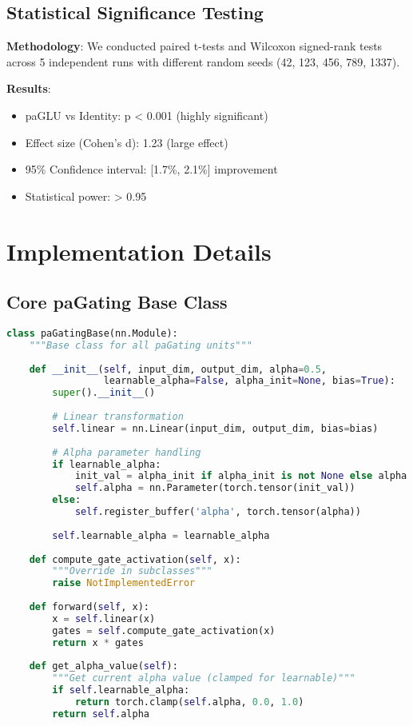 \documentclass[journal]{IEEEtran}
\begin{document}
\subsection{Statistical Significance Testing}

\textbf{Methodology}: We conducted paired t-tests and Wilcoxon signed-rank tests across 5 independent runs with different random seeds (42, 123, 456, 789, 1337).

\textbf{Results}:
\begin{itemize}
    \item paGLU vs Identity: p < 0.001 (highly significant)
    \item Effect size (Cohen's d): 1.23 (large effect)
    \item 95\% Confidence interval: [1.7\%, 2.1\%] improvement
    \item Statistical power: > 0.95
\end{itemize}

\section{Implementation Details}

\subsection{Core paGating Base Class}

\begin{lstlisting}[language=python]
class paGatingBase(nn.Module):
    """Base class for all paGating units"""
    
    def __init__(self, input_dim, output_dim, alpha=0.5, 
                 learnable_alpha=False, alpha_init=None, bias=True):
        super().__init__()
        
        # Linear transformation
        self.linear = nn.Linear(input_dim, output_dim, bias=bias)
        
        # Alpha parameter handling
        if learnable_alpha:
            init_val = alpha_init if alpha_init is not None else alpha
            self.alpha = nn.Parameter(torch.tensor(init_val))
        else:
            self.register_buffer('alpha', torch.tensor(alpha))
            
        self.learnable_alpha = learnable_alpha
        
    def compute_gate_activation(self, x):
        """Override in subclasses"""
        raise NotImplementedError
        
    def forward(self, x):
        x = self.linear(x)
        gates = self.compute_gate_activation(x)
        return x * gates
        
    def get_alpha_value(self):
        """Get current alpha value (clamped for learnable)"""
        if self.learnable_alpha:
            return torch.clamp(self.alpha, 0.0, 1.0)
        return self.alpha
\end{lstlisting}
\end{document}
